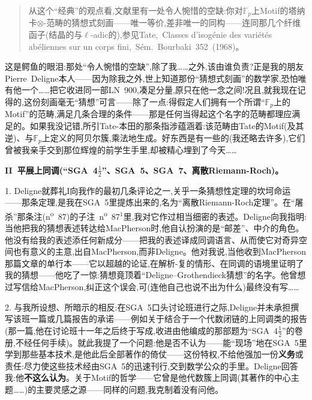 \begin{quote}
从这个“经典”的观点看,文献里有一处令人惋惜的空缺:你对$\mathbb{F}_p$上Motif的塔纳卡$\otimes$-范畴的猜想式刻画——唯一等价,差非唯一的同构——连同那几个纤维函子(结晶的与$\ell$-adic的),参见Tate,~Classes d'isogénie des variétés abéliennes sur un corps fini,~Sém.~Bourbaki~352~(1968)。
\end{quote}

这是鳄鱼的眼泪:那处“令人惋惜的空缺”,除了我……之外,该由谁负责?正是我的朋友Pierre~Deligne本人——因为除我之外,世上知道那份“猜想式刻画”的数学家,恐怕唯有他一个……把它收进同一部LN~900,凑足分量,原只在他一念之间!况且,就我现在记得的,这份刻画毫无“猜想”可言——除了一点:得假定人们拥有一个所谓“$\mathbb{F}_p$上的Motif”的范畴,满足几条合理的条件——那是任何当得起这个名字的范畴都理应满足的。如果我没记错,所引Tate-本田的那条指涉蕴涵着:该范畴由Tate的Motif(及其逆)、与$\mathbb{F}_p$上定义的阿贝尔簇,乘法地生成。好东西是有一些的(我还略去许多),它们曾被我亲手交到那位辉煌的前学生手里,却被精心埋到了今天……

\textbf{II~平展上同调(“SGA~4$\frac{1}{2}$”、SGA~5、SGA~7、离散Riemann-Roch)。}

1. Deligne就葬礼I向我作的最初几条评论之一\dmark{},关乎一条猜想性定理的坎坷命运——那条定理,是我在SGA~5里提炼出来的,名为“离散Riemann-Roch定理”。在“屠杀”那条注(n\textsuperscript{o}~87)的子注~n\textsuperscript{o}~87$^1$里,我对它作过相当细密的表述。Deligne向我指明:当他把我的猜想表述转达给MacPherson时,他自认扮演的是“邮差”、中介的角色。他没有给我的表述添任何新成分——把我的表述译成同调语言、从而使它对奇异空间也有意义的主意,出自MacPherson,而非Deligne。他对我说,当他收到MacPherson那篇文章的单行本——它以超越的论证,在解析-复的情形、在同调的语境里证明了我的猜想——他吃了一惊:猜想竟顶着“Deligne--Grothendieck猜想”的名字。他曾想过写信给MacPherson,纠正这个误会,可(连他自己也说不出为什么)最终没有写……

2. 与我所设想、所暗示的相反:在SGA~5口头讨论班进行之际,Deligne并未承担撰写该班一篇或几篇报告的承诺——例如关于结合于一个代数闭链的上同调类的报告(那一篇,他在讨论班十一年之后终于写成,收进由他编成的那部题为“SGA~4$\frac{1}{2}$”的卷册,不经任何手续)。就此我提了一个问题:他是否不认为——能“现场”地在SGA~5里学到那些基本技术,是他此后全部著作的倚仗——这份特权,不给他强加一份\textbf{义务}或责任:尽力使这些技术经由SGA~5的迅速刊行,交到数学公众的手里。Deligne回答我:他\textbf{不这么认为}。关于Motif的哲学——它曾是他代数簇上同调(其著作的中心主题……)的主要灵感之源——同样的问题,我克制着没有问他。

